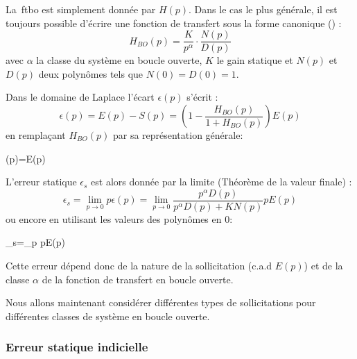 \begin{center}
\end{center}

La~\gls{ftbo} est simplement donnée par $H(p)$. Dans le cas le plus
générale, il est toujours possible d'écrire une fonction de transfert
sous la forme canonique () :
$$
H_{BO}(p)=\dfrac{K}{p^\alpha}\cdot\dfrac{N(p)}{D(p)}
$$
avec $\alpha$ la classe du système en boucle ouverte, $K$ le gain statique et 
$N(p)$ et $D(p)$ deux polynômes tels que $N(0)=D(0)=1$. 


Dans le domaine de Laplace l'écart $\epsilon(p)$ s'écrit :
$$
\epsilon(p)=E(p)-S(p)=\left(1-\dfrac{H_{BO}(p)}{1+H_{BO}(p)}\right)E(p)
$$
en remplaçant $H_{BO}(p)$ par sa représentation générale:
\begin{bequation}
\epsilon(p)=E(p)
\end{bequation}

L'erreur statique $\epsilon_s$ est alors donnée par la limite (Théorème 
de la valeur finale) :
$$
\epsilon_s=\lim\limits_{p\to 0} p\epsilon(p)=\lim\limits_{p\to 0} 
           \dfrac{p^\alpha D(p)}{p^\alpha D(p)+KN(p)}pE(p) 
$$
ou encore en utilisant les valeurs des polynômes en 0: 
\begin{bequation}
	\epsilon_s=\lim\limits_{p} pE(p)
	\label{eq-erreurStatique}
\end{bequation}

Cette erreur dépend donc de la nature de la sollicitation (c.a.d $E(p)$) et 
de la classe $\alpha$ de la fonction de transfert en boucle ouverte.

Nous allons maintenant considérer différentes types de sollicitations pour 
différentes classes de système en boucle ouverte.

\subsubsection{Erreur statique indicielle}

